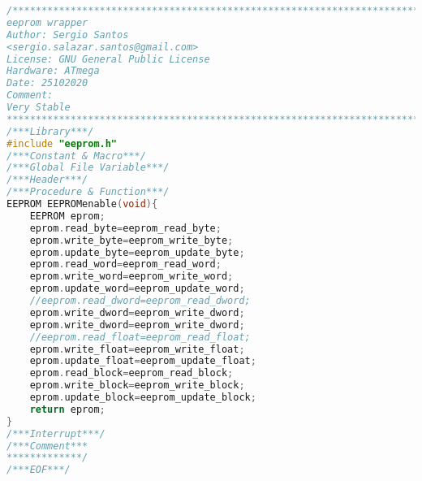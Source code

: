 \begin{lstlisting}[language=C]
/*************************************************************************
eeprom wrapper
Author: Sergio Santos
<sergio.salazar.santos@gmail.com>
License: GNU General Public License
Hardware: ATmega
Date: 25102020
Comment:
Very Stable
*************************************************************************/
/***Library***/
#include "eeprom.h"
/***Constant & Macro***/
/***Global File Variable***/
/***Header***/
/***Procedure & Function***/
EEPROM EEPROMenable(void){
	EEPROM eprom;
	eprom.read_byte=eeprom_read_byte;
	eprom.write_byte=eeprom_write_byte;
	eprom.update_byte=eeprom_update_byte;
	eprom.read_word=eeprom_read_word;
	eprom.write_word=eeprom_write_word;
	eprom.update_word=eeprom_update_word;
	//eeprom.read_dword=eeprom_read_dword;
	eprom.write_dword=eeprom_write_dword;
	eprom.write_dword=eeprom_write_dword;
	//eeprom.read_float=eeprom_read_float;
	eprom.write_float=eeprom_write_float;
	eprom.update_float=eeprom_update_float;
	eprom.read_block=eeprom_read_block;
	eprom.write_block=eeprom_write_block;
	eprom.update_block=eeprom_update_block;
	return eprom;
}
/***Interrupt***/
/***Comment***
*************/
/***EOF***/
\end{lstlisting}
